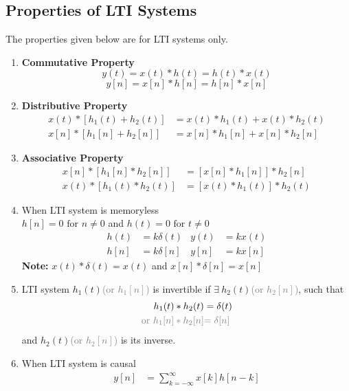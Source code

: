 \documentclass[oneside]{book}
\begin{document}
\subsection{Properties of LTI Systems}
The properties given below are for LTI systems only.
\begin{enumerate}
	\item \textbf{Commutative Property}
	      \[
		      y(t) = x(t) * h(t) = h(t) * x(t)
	      \]
	      \[
		      y[n] = x[n] * h[n] = h[n] * x[n]
	      \]
	\item \textbf{Distributive Property}
	      \begin{align*}
		      x(t)*[h_1(t) + h_2(t)] & = x(t)*h_1(t) + x(t)*h_2(t) \\
		      x[n]*[h_1[n] + h_2[n]] & = x[n]*h_1[n] + x[n]*h_2[n]
	      \end{align*}
	\item \textbf{Associative Property}
	      \begin{align*}
		      x[n]*[h_1[n] *h_2[n]] & = [x[n]*h_1[n]]*h_2[n] \\
		      x(t)*[h_1(t) *h_2(t)] & = [x(t)*h_1(t)]*h_2(t)
	      \end{align*}
	\item When LTI system is memoryless\\
	      \(h[n] = 0 \text{ for } n \neq 0\) and \(h(t) = 0 \text{ for } t \neq 0\)
	      \begin{align*}
		      h(t) & = k\delta(t) & y(t) & = kx(t) \\
		      h[n] & = k\delta[n] & y[n] & = kx[n]
	      \end{align*}
	      \textbf{Note: } \(x(t)*\delta(t) = x(t)\) and \(x[n]*\delta[n] = x[n]\)
	\item LTI system \(h_1(t)\)\textcolor{gray}{(or \(h_1[n]\))} is invertible if \(\exists\ h_2(t)\)\textcolor{gray}{(or \(h_2[n]\))}, such that
	      \begin{align*}
		      h_1(t)*h_2(t)                                & = \delta(t)                   \\
		      \textcolor{gray}{\text{or } h_1[n] * h_2[n]} & \textcolor{gray}{= \delta[n]}
	      \end{align*}
	      and \(h_2(t)\)\textcolor{gray}{(or \(h_2[n]\))} is its inverse.
	\item When LTI system is causal
	      \begin{align*}
		      y[n] & = \sum\limits_{k = -\infty}^{\infty} x[k]h[n-k]                          \\

\end{align*}
\end{enumerate}
\end{document}
